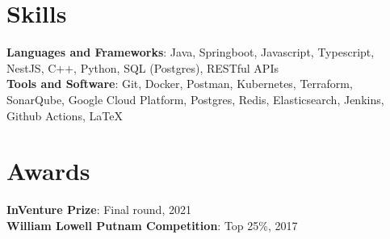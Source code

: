 \documentclass[letterpaper,11pt]{article}
\begin{document}
\section{Skills}
 \begin{itemize}[leftmargin=0.15in, rightmargin=\leftmargin, label={}]
    \small{\item{
      {\color{accent}\textbf{Languages and Frameworks}}{: Java, Springboot, Javascript, Typescript, NestJS, C++, Python, SQL (Postgres), RESTful APIs} \\
     {\color{accent}\textbf{Tools and Software}}{: Git, Docker, Postman, Kubernetes, Terraform, SonarQube, Google Cloud Platform, Postgres, Redis, Elasticsearch, Jenkins, Github Actions, LaTeX}
    }}
 \end{itemize}

\section{Awards}
\begin{itemize}[leftmargin=0.15in, rightmargin=\leftmargin, label={}]
   \small{\item{
     {\color{accent}\textbf{InVenture Prize}}{: Final round, 2021} \\
    {\color{accent}\textbf{William Lowell Putnam Competition}}{: Top 25\%, 2017}
   }}
\end{itemize}


\end{document}
